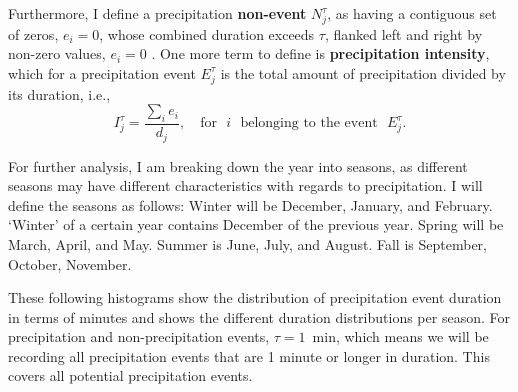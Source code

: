 \documentclass[11pt]{report}
\newcommand{\fracd}[2]{\frac{\displaystyle{#1}}{\displaystyle{#2}}}
\begin{document}
Furthermore, I define a precipitation \textbf{non-event} $N_j^\tau$, as
having a contiguous set of zeros, $e_i=0$, whose combined duration exceeds
$\tau$, flanked left and right by non-zero values, $e_i=0$ \cite{Eagleson}.
One more term to define is \textbf{precipitation intensity}, which for a
precipitation event $E_j^\tau$ is the total amount of precipitation divided
by its duration, i.e.,
\begin{equation}
  I_j^\tau = \fracd{\sum_i e_i }{d_j} ,
  \quad
  \mbox{for}\,\,\,\, i\,\,\,\, \mbox{belonging to the event}\,\,\,\, E_j^\tau
  .
\end{equation}

For further analysis, I am breaking down the year into seasons, as different
seasons may have different characteristics with regards to precipitation. I
will define the seasons as follows: Winter will be December, January, and
February. `Winter' of a certain year contains December of the previous
year. Spring will be March, April, and May. Summer is June, July, and
August. Fall is September, October, November.

These following histograms show the distribution of precipitation event
duration in terms of minutes and shows the different duration distributions
per season. For precipitation and non-precipitation events, $\tau = 1$~min,
which means we will be recording all precipitation events that are 1 minute
or longer in duration. This covers all potential precipitation events.
\end{document}
